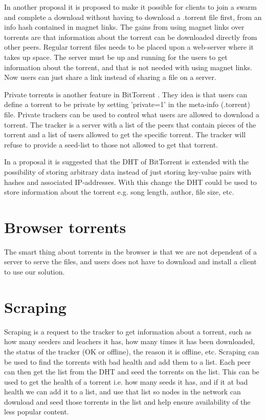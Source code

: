In another proposal \citep{bittorrent:bep09} it is proposed to make it possible for clients to join a swarm and complete a download without having to download a .torrent file first, from an info hash contained in magnet links. The gains from using magnet links over torrents are that information about the torrent can be downloaded directly from other peers. Regular torrent files needs to be placed upon a web-server where it takes up space. The server must be up and running for the users to get information about the torrent, and that is not needed with using magnet links.
Now users can just share a link instead of sharing a file on a server.

Private torrents is another feature in BitTorrent \citep{bittorrent:bep27}. They idea is that users can define a torrent to be private by setting 'private=1' in the meta-info (.torrent) file. Private trackers can be used to control what users are allowed to download a torrent. The tracker is a server with a list of the peers that contain pieces of the torrent and a list of users allowed to get the specific torrent.
The tracker will refuse to provide a seed-list to those not allowed to get that torrent.

In a proposal \citep{bittorrent:bep44} it is suggested that the \acs{DHT} of BitTorrent is extended with the possibility of storing arbitrary data instead of just storing key-value pairs with hashes and associated \acs{IP}-addresses.
With this change the \acs{DHT} could be used to store information about the torrent e.g. song length, author, file size, etc.

\section{Browser torrents}
The smart thing about torrents in the browser is that we are not dependent of a server to serve the files, and users does not have to download and install a client to use our solution.

\section{Scraping}
Scraping is a request to the tracker to get information about a torrent, such as how many seeders and leachers it has, how many times it has been downloaded, the status of the tracker (OK or offline), the reason it is offline, etc.
Scraping can be used to find the torrents with bad health and add them to a list. Each peer can then get the list from the \acs{DHT} and seed the torrents on the list.
This can be used to get the health of a torrent i.e. how many seeds it has, and if it at bad health we can add it to a list, and use that list so nodes in the network can download and seed those torrents in the list and help ensure availability of the less popular content.
